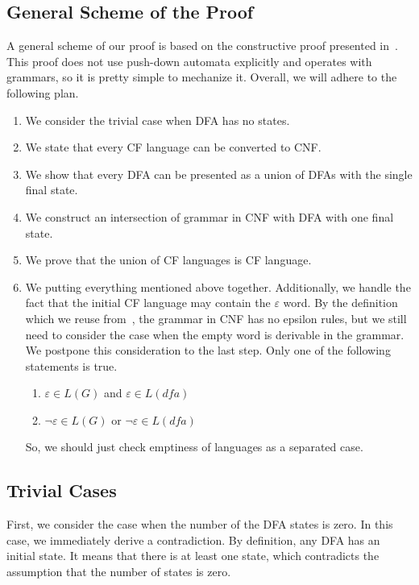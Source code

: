 \subsection{General Scheme of the Proof}

A general scheme of our proof is based on the constructive proof presented in~\cite{beigelproof}.
This proof does not use push-down automata explicitly and operates with grammars, so it is pretty simple to mechanize it.
Overall, we will adhere to the following plan. 

\begin{enumerate}
    \item We consider the trivial case when DFA has no states.
    \item We state that every CF language can be converted to CNF.
    \item We show that every DFA can be presented as a union of DFAs with the single final state.
    \item We construct an intersection of grammar in CNF with DFA with one final state.
    \item We prove that the union of CF languages is CF language.
    \item We putting everything mentioned above together. 
	Additionally, we handle the fact that the initial CF language may contain the $\varepsilon$ word. By the definition which we reuse from~\cite{smolkaHofmann2016}, the grammar in CNF has no epsilon rules, but we still need to consider the case when the empty word is derivable in the grammar. We postpone this consideration to the last step. Only one of the following statements is true. 

\begin{enumerate}
	\item $\varepsilon \in L(G)$ and $\varepsilon \in L(\textit{dfa})$
	\item $\neg \varepsilon \in L(G)$ or $\neg \varepsilon \in L(\textit{dfa})$
\end{enumerate}

So, we should just check emptiness of languages as a separated case.

\end{enumerate}


\subsection{Trivial Cases}

First, we consider the case when the number of the DFA states is zero. 
In this case, we immediately derive a contradiction.
By definition, any DFA has an initial state. 
It means that there is at least one state, which contradicts the assumption that the number of states is zero.

